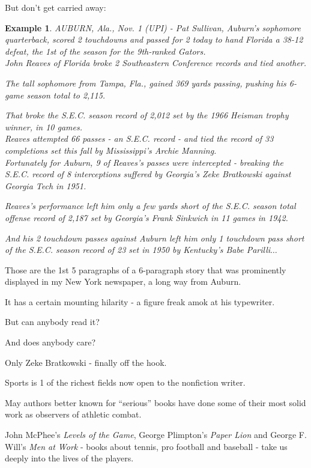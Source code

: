 \documentclass{book}
\numberwithin{equation}{section}
\newtheorem{example}{Example}[chapter]
\begin{document}
But don't get carried away:
\begin{example}
    AUBURN, Ala., Nov. 1 (UPI) - Pat Sullivan, Auburn's sophomore quarterback, scored 2 touchdowns and passed for 2 today to hand Florida a 38-12 defeat, the 1st of the season for the 9th-ranked Gators.
    \\
    
    John Reaves of Florida broke 2 Southeastern Conference records and tied another.
    
    The tall sophomore from Tampa, Fla., gained 369 yards passing, pushing his 6-game season total to 2,115.
    
    That broke the S.E.C. season record of 2,012 set by the 1966 Heisman trophy winner, in 10 games.
    \\
    
    Reaves attempted 66 passes - an S.E.C. record - and tied the record of 33 completions set this fall by Mississippi's Archie Manning.
    \\
    
    Fortunately for Auburn, 9 of Reaves's passes were intercepted - breaking the S.E.C. record of 8 interceptions suffered by Georgia's Zeke Bratkowski against Georgia Tech in 1951.
    
    Reaves's performance left him only a few yards short of the S.E.C. season total offense record of 2,187 set by Georgia's Frank Sinkwich in 11 games in 1942.
    
    And his 2 touchdown passes against Auburn left him only 1 touchdown pass short of the S.E.C. season record of 23 set in 1950 by Kentucky's Babe Parilli$\ldots$
\end{example}
Those are the 1st 5 paragraphs of a 6-paragraph story that was prominently displayed in my New York newspaper, a long way from Auburn.

It has a certain mounting hilarity - a figure freak amok at his typewriter.

But can anybody read it?

And does anybody care?

Only Zeke Bratkowski - finally off the hook.

%
Sports is 1 of the richest fields now open to the nonfiction writer.

May authors better known for ``serious'' books have done some of their most solid work as observers of athletic combat.

John McPhee's \textit{Levels of the Game}, George Plimpton's \textit{Paper Lion} and George F. Will's \textit{Men at Work} - books about tennis, pro football and baseball - take us deeply into the lives of the players.
\end{document}
